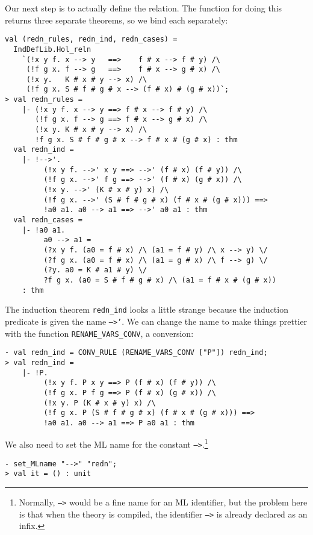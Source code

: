 \documentclass[12pt]{article}
\begin{document}
Our next step is to actually define the relation.  The function for
doing this returns three separate theorems, so we bind each
separately:
\begin{session}\begin{verbatim}
val (redn_rules, redn_ind, redn_cases) =
  IndDefLib.Hol_reln
    `(!x y f. x --> y   ==>    f # x --> f # y) /\
     (!f g x. f --> g   ==>    f # x --> g # x) /\
     (!x y.   K # x # y --> x) /\
     (!f g x. S # f # g # x --> (f # x) # (g # x))`;
> val redn_rules =
    |- (!x y f. x --> y ==> f # x --> f # y) /\
       (!f g x. f --> g ==> f # x --> g # x) /\
       (!x y. K # x # y --> x) /\
       !f g x. S # f # g # x --> f # x # (g # x) : thm
  val redn_ind =
    |- !-->'.
         (!x y f. -->' x y ==> -->' (f # x) (f # y)) /\
         (!f g x. -->' f g ==> -->' (f # x) (g # x)) /\
         (!x y. -->' (K # x # y) x) /\
         (!f g x. -->' (S # f # g # x) (f # x # (g # x))) ==>
         !a0 a1. a0 --> a1 ==> -->' a0 a1 : thm
  val redn_cases =
    |- !a0 a1.
         a0 --> a1 =
         (?x y f. (a0 = f # x) /\ (a1 = f # y) /\ x --> y) \/
         (?f g x. (a0 = f # x) /\ (a1 = g # x) /\ f --> g) \/
         (?y. a0 = K # a1 # y) \/
         ?f g x. (a0 = S # f # g # x) /\ (a1 = f # x # (g # x))
    : thm
\end{verbatim}\end{session}
    The induction theorem \texttt{redn\_ind} looks a little strange
    because the induction predicate is given the name \texttt{-->'}.
    We can change the name to make things prettier with the function
    \texttt{RENAME\_VARS\_CONV}, a conversion:
\begin{session}\begin{verbatim}
- val redn_ind = CONV_RULE (RENAME_VARS_CONV ["P"]) redn_ind;
> val redn_ind =
    |- !P.
         (!x y f. P x y ==> P (f # x) (f # y)) /\
         (!f g x. P f g ==> P (f # x) (g # x)) /\
         (!x y. P (K # x # y) x) /\
         (!f g x. P (S # f # g # x) (f # x # (g # x))) ==>
         !a0 a1. a0 --> a1 ==> P a0 a1 : thm
\end{verbatim}\end{session}
    We also need to set the ML name for the constant
    \texttt{-->}.\footnote{Normally, \texttt{-->} would be a fine name
      for an ML identifier, but the problem here is that when the
      theory is compiled, the identifier \texttt{-->} is already
      declared as an infix.}
\begin{session}\begin{verbatim}
- set_MLname "-->" "redn";
> val it = () : unit
\end{verbatim}\end{session}
\end{document}
